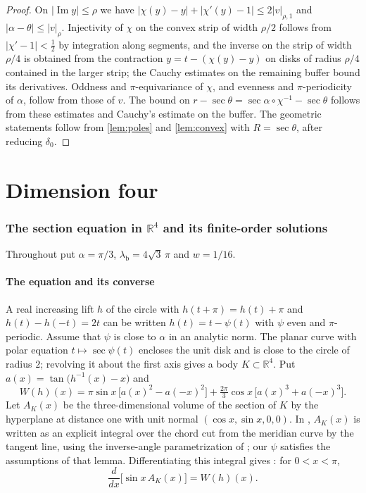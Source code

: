 \documentclass[11pt]{amsart}
\numberwithin{equation}{section}
\theoremstyle{definition}
\theoremstyle{remark}
\newcommand{\R}{\mathbb{R}}
\newcommand{\abs}[1]{\lvert #1\rvert}
\newcommand{\lb}{\lambda_{\mathrm b}}
\begin{document}
\begin{proof}
On $\abs{\operatorname{Im}y}\le\rho$ we have $\abs{\chi(y)-y}+\abs{\chi'(y)-1}\le2\abs v_{\rho,1}$ and $\abs{\alpha-\theta}\le\abs v_{\rho}$. Injectivity of $\chi$ on the convex strip of width $\rho/2$ follows from $\abs{\chi'-1}<\frac12$ by integration along segments, and the inverse on the strip of width $\rho/4$ is obtained from the contraction $y=t-(\chi(y)-y)$ on disks of radius $\rho/4$ contained in the larger strip; the Cauchy estimates on the remaining buffer bound its derivatives. Oddness and $\pi$-equivariance of $\chi$, and evenness and $\pi$-periodicity of $\alpha$, follow from those of $v$. The bound on $r-\sec\theta=\sec\alpha\circ\chi^{-1}-\sec\theta$ follows from these estimates and Cauchy's estimate on the buffer. The geometric statements follow from \cref{lem:poles} and \cref{lem:convex} with $R=\sec\theta$, after reducing $\delta_0$.
\end{proof}

\part{Dimension four}\label{part:d4}

\section{The section equation in \texorpdfstring{$\R^4$}{R4} and its finite-order solutions}\label{sec:d4eq}

Throughout \cref{part:d4} put $\alpha=\pi/3$, $\lb=4\sqrt3\,\pi$ and $w=1/16$.

\subsection{The equation and its converse}
A real increasing lift $h$ of the circle with $h(t+\pi)=h(t)+\pi$ and $h(t)-h(-t)=2t$ can be written $h(t)=t-\psi(t)$ with $\psi$ even and $\pi$-periodic. Assume that $\psi$ is close to $\alpha$ in an analytic norm. The planar curve with polar equation $t\mapsto\sec\psi(t)$ encloses the unit disk and is close to the circle of radius $2$; revolving it about the first axis gives a body $K\subset\R^4$. Put $a(x)=\tan\bigl(h^{-1}(x)-x\bigr)$ and
\begin{equation}\label{eq:W}
W(h)(x)=\pi\sin x\,\bigl[a(x)^2-a(-x)^2\bigr]+\tfrac{2\pi}{3}\cos x\,\bigl[a(x)^3+a(-x)^3\bigr].
\end{equation}
Let $A_K(x)$ be the three-dimensional volume of the section of $K$ by the hyperplane at distance one with unit normal $(\cos x,\sin x,0,0)$. In \cite[Section~2.2]{Had}, $A_K(x)$ is written as an explicit integral over the chord cut from the meridian curve by the tangent line, using the inverse-angle parametrization of \cite[Lemma~1]{Had}; our $\psi$ satisfies the assumptions of that lemma. Differentiating this integral gives \cite[equation~(6)]{Had}: for $0<x<\pi$,
\begin{equation}\label{eq:sinA}
\frac{d}{dx}\bigl[\sin x\,A_K(x)\bigr]=W(h)(x).
\end{equation}
\end{document}
